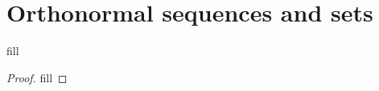 \section{Orthonormal sequences and sets}

\begin{exercise}{1}
fill
\end{exercise}
\begin{proof}
fill
\end{proof}